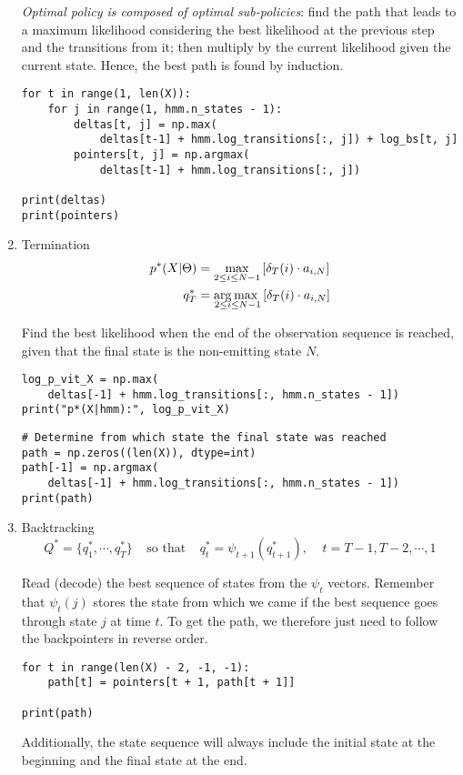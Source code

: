 \documentclass[11pt]{article}
\begin{document}
\begin{enumerate}
\emph{Optimal policy is composed of optimal sub-policies}: find the path that
leads to a maximum likelihood considering the best likelihood at the
previous step and the transitions from it; then multiply by the current
likelihood given the current state. Hence, the best path is found by
induction.

\begin{verbatim}
for t in range(1, len(X)):
    for j in range(1, hmm.n_states - 1):
        deltas[t, j] = np.max(
            deltas[t-1] + hmm.log_transitions[:, j]) + log_bs[t, j]
        pointers[t, j] = np.argmax(
            deltas[t-1] + hmm.log_transitions[:, j])

print(deltas)
print(pointers)
\end{verbatim}

\item Termination
\label{sec:org11be1b8}
\begin{align*}
        p^*(X|\Theta) &= \max_{2 \leq i \leq N-1}
            \left[ \delta_{T}(i) \cdot a_{i,N} \right] \\
        q_T^* &= \mbox{arg}\hspace{-0.5ex}\max_{\hspace{-3ex}2 \leq i \leq N-1}
            \left[ \delta_{T}(i) \cdot a_{i,N} \right]
\end{align*}

Find the best likelihood when the end of the observation sequence is
reached, given that the final state is the non-emitting state \(N\).

\begin{verbatim}
log_p_vit_X = np.max(
    deltas[-1] + hmm.log_transitions[:, hmm.n_states - 1])
print("p*(X|hmm):", log_p_vit_X)
\end{verbatim}

\begin{verbatim}
# Determine from which state the final state was reached
path = np.zeros((len(X)), dtype=int)
path[-1] = np.argmax(
    deltas[-1] + hmm.log_transitions[:, hmm.n_states - 1])
print(path)
\end{verbatim}

\item Backtracking
\label{sec:org3667fb3}
$$
        Q^* = \{q_1^*,\cdots,q_T^*\} \;\;\;\;\mbox{so that}\;\;\;\;
        q_t^* = \psi_{t+1}(q_{t+1}^*), \;\;\;\; t = T-1, T-2, \cdots, 1
$$

Read (decode) the best sequence of states from the \(\psi_t\) vectors.
Remember that \(\psi_t (j)\) stores the state from which we came if the
best sequence goes through state \(j\) at time \(t\). To get the path, we
therefore just need to follow the backpointers in reverse order.

\begin{verbatim}
for t in range(len(X) - 2, -1, -1):
    path[t] = pointers[t + 1, path[t + 1]]

print(path)
\end{verbatim}

Additionally, the state sequence will always include the initial state
at the beginning and the final state at the end.
\end{enumerate}
\end{document}
